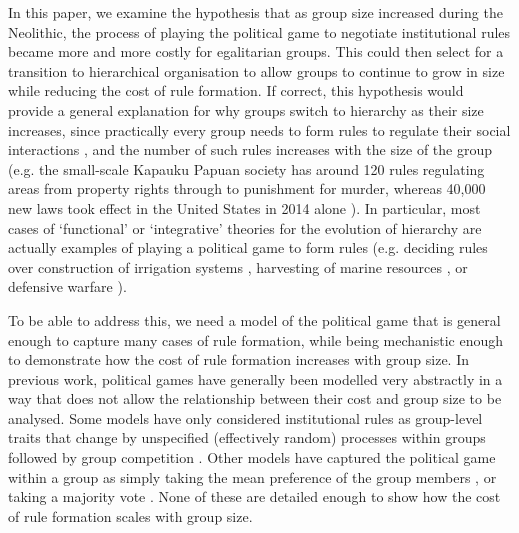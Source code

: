 \documentclass{rstb}
\begin{document}
\begin{linenumbers}
In this paper, we examine the hypothesis that as group size increased during the Neolithic, the process of playing the political game to negotiate institutional rules became more and more costly for egalitarian groups. This could then select for a transition to hierarchical organisation to allow groups to continue to grow in size while reducing the cost of rule formation. If correct, this hypothesis would provide a general explanation for why groups switch to hierarchy as their size increases, since practically every group needs to form rules to regulate their social interactions \cite{North:1990:a,Fukuyama:2011:a}, and the number of such rules increases with the size of the group (e.g. the small-scale Kapauku Papuan society has around 120 rules regulating areas from property rights through to punishment for murder, whereas 40,000 new laws took effect in the United States in 2014 alone \cite{Singh:2017:a}). In particular, most cases of `functional' or `integrative' theories for the evolution of hierarchy \cite{Calvert:1992:a,vanVugt:2006:a,King:2009:a,Hooper:2010:a,Sterelny:2013:a} are actually examples of playing a political game to form rules (e.g. deciding rules over construction of irrigation systems \cite{Wittfogel:1957:a,Nichols:1993:a,Spencer:1993:a,Carballo:2014:a}, harvesting of marine resources \cite{Arnold:1995:a,Friesen:1999:a,Alvard:2002:a}, or defensive warfare \cite{Boone:1992:a,Roscoe:2013:a}). 

To be able to address this, we need a model of the political game that is general enough to capture many cases of rule formation, while being mechanistic enough to demonstrate how the cost of rule formation increases with group size. In previous work, political games have generally been modelled very abstractly in a way that does not allow the relationship between their cost and group size to be analysed. Some models have only considered institutional rules as group-level traits that change by unspecified (effectively random) processes within groups followed by group competition \cite{Turchin:2013:a,Richerson:2016:a}. Other models have captured the political game within a group as simply taking the mean preference of the group members \cite{Powers:2013:a,Powers:2017:a}, or taking a majority vote \cite{Currie:2021:a}. None of these are detailed enough to show how the cost of rule formation scales with group size. 


\end{linenumbers}
\end{document}

